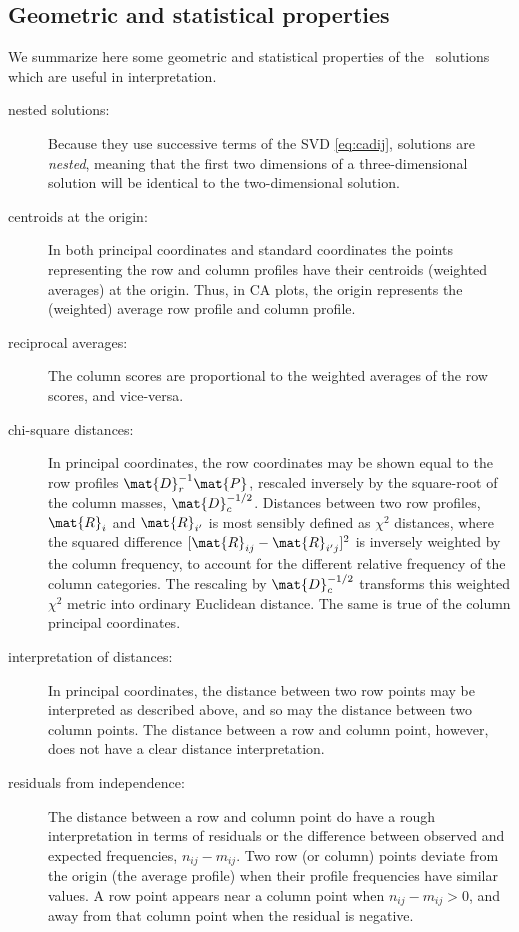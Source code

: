 \documentclass[11pt]{book}\usepackage[]{graphicx}\usepackage[]{color}
\begin{document}
\subsection{Geometric and statistical properties}\label{sec:ca-properties}
We summarize here some geometric and statistical properties of the
\CA\ solutions which are useful in interpretation.

\begin{description}
\item[nested solutions:] Because they use successive terms of the SVD
  \eqref{eq:cadij}, \ca solutions are \emph{nested}, meaning that the first
  two dimensions of a three-dimensional solution will be identical
  to the two-dimensional solution.

\item[centroids at the origin:] In both principal coordinates and standard
coordinates the points representing the row and column profiles have their
centroids (weighted averages) at the origin.
Thus, in CA plots, the origin represents the (weighted) average
row profile and column profile.

\item[reciprocal averages:]
The column scores are proportional to the weighted averages of the row
scores, and vice-versa.

\item[chi-square distances:]  In principal coordinates, the row coordinates
may be shown equal to the row profiles $\mat{D}_r^{-1} \mat{P}$, rescaled inversely by the square-root of the column masses, $\mat{D}_c^{-1/2}$.
Distances between two row profiles, $\mat{R}_i$ and $\mat{R}_{i^\prime}$
is most sensibly defined as $\chi^2$ distances, where the squared
difference $[\mat{R}_{ij} -\mat{R}_{i^\prime j}]^2$ is inversely weighted
by the column frequency, to account for the different relative
frequency of the column categories.
The rescaling by $\mat{D}_c^{-1/2}$ transforms this weighted $\chi^2$
metric into ordinary Euclidean distance.
The same is true of the column principal coordinates.

\item[interpretation of distances:]
In principal coordinates,
the distance between two row points may be interpreted as described
above, and so may the distance between two column points.
The distance between a row and column point, however, does not have
a clear distance interpretation.

\item[residuals from independence:]
The distance between a row and column point do have a rough
interpretation in terms of residuals or the difference between
observed and expected frequencies, $n_{ij} - m_{ij}$.
Two row (or column) points deviate from the origin (the average
profile) when their profile frequencies have similar values.
A row point appears near a column point when  $n_{ij} - m_{ij} >
0$, and away from that column point when the residual is negative.
\end{description}
\end{document}

